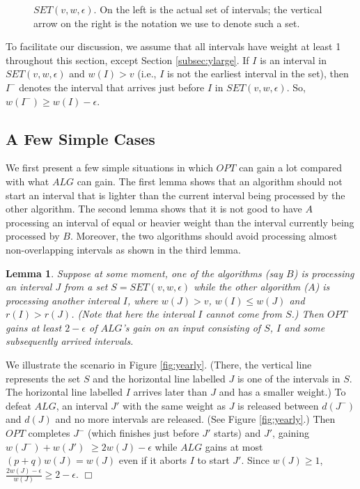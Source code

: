 \documentclass[11pt]{article}
\newtheorem{lemma}{Lemma}[section]
\newcommand{\qed}{\hspace*{\fill}$\Box$\par\medskip}
\newenvironment{proof}{\noindent{\it Proof. }\ignorespaces}{\qed}
\begin{document}
\begin{figure}
\centerline{ \epsfysize=1.2in  }
\caption{$SET(v,w,\epsilon)$.  On the left is the actual set of 
intervals; the vertical arrow on the right is the notation we use to denote 
such a set.}
\label{fig:set}
\end{figure}

To facilitate our discussion, 
we assume that all intervals have weight at least 1
throughout this section, except Section \ref{subsec:ylarge}.
If $I$ is an interval in $SET(v, w, \epsilon)$ and $w(I) > v$
(i.e., $I$ is not the earliest interval in the set),
then $I^-$ denotes the interval
that arrives just before $I$ in $SET(v, w, \epsilon)$.
So, $w(I^-) \geq w(I) - \epsilon$.

\subsection{A Few Simple Cases}

We first present a few simple situations in which $OPT$ can gain
a lot compared with what $ALG$ can gain.
The first lemma shows that an algorithm should not start an interval
that is lighter than the current interval being processed by the
other algorithm.
The second lemma shows that it is not good to have
$A$ processing an interval of equal or heavier weight
than the interval currently being processed by $B$.
Moreover, the two algorithms should avoid processing
almost non-overlapping intervals
as shown in the third lemma.

\begin{lemma} \label{lem:YEarly}
Suppose at some moment,
one of the algorithms (say $B$) is processing
an interval $J$ from a set $S = SET(v,w,\epsilon)$
while the other algorithm ($A$) is processing
another interval $I$,
where $w(J)>v$, $w(I) \leq w(J)$ and $r(I)>r(J)$.
(Note that here the interval $I$ cannot come from $S$.)
Then $OPT$ gains at least $2-\epsilon$ of $ALG$'s
gain on an input consisting of
$S$, $I$ and some subsequently arrived intervals.
\end{lemma}

\begin{proof}
We illustrate the scenario in Figure \ref{fig:yearly}.
(There, the vertical line represents the set $S$ 
and the horizontal line labelled $J$ is one of the intervals
in $S$.
The horizontal line labelled $I$ arrives later than $J$
and has a smaller weight.)
To defeat $ALG$, 
an interval $J'$ with the same weight as $J$ is released
between $d(J^-)$ and $d(J)$
and no more intervals are released.
(See Figure \ref{fig:yearly}.)
Then $OPT$ completes $J^-$ (which finishes just before $J'$ starts)
and $J'$, gaining $w(J^-) + w(J')$ $\geq 2w(J) - \epsilon$
while $ALG$ gains at most $(p+q) w(J) = w(J)$ even if
it aborts $I$ to start $J'$.
Since $w(J) \geq 1$, $\frac{2w(J)-\epsilon}{w(J)} \geq 2-\epsilon$.
\end{proof}
\end{document}
